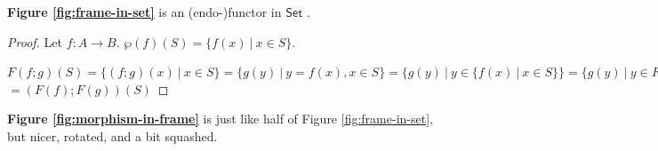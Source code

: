 \begin{proposition}\textbf{Figure \ref{fig:frame-in-set}} is an (endo-)functor in $\mathsf{Set}$ .\end{proposition}

\begin{proof} Let $f : A \to B$. $\wp(f)(S) = \{f(x) ~|~ x \in S\}$. 

$F(f;g)(S) = \{ (f;g)(x) ~|~ x \in S\} = \{ g(y) ~|~ y = f(x), x \in S\} =  \{g (y) ~|~ y \in \{ f(x) ~|~ x \in S\}\} = \{g (y) ~|~ y \in F(f)(S)\} $\\
$= (F(f);F(g))(S)$
\end{proof}

\textbf{Figure \ref{fig:morphism-in-frame}} is just like half of Figure \ref{fig:frame-in-set}, but nicer, rotated, and a bit squashed.

